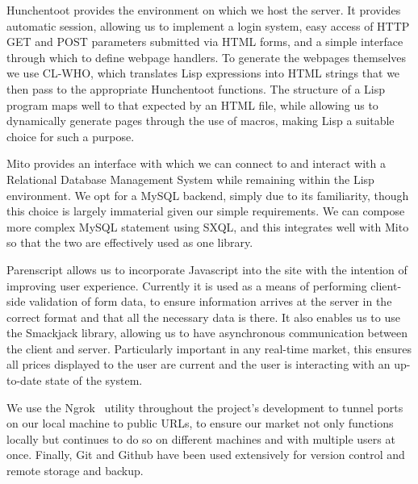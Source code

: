 Hunchentoot provides the environment on which we host the server. It provides
automatic session, allowing us to implement a login system, easy access of HTTP
GET and POST parameters submitted via HTML forms, and a simple interface
through which to define webpage handlers. To generate the webpages themselves
we use CL-WHO, which translates Lisp expressions into HTML strings that we then
pass to the appropriate Hunchentoot functions. The structure of a Lisp program
maps well to that expected by an HTML file, while allowing us to dynamically
generate pages through the use of macros, making Lisp a suitable choice for
such a purpose.

Mito provides an interface with which we can connect to and interact with a
Relational Database Management System while remaining within the Lisp
environment. We opt for a MySQL backend, simply due to its familiarity, though
this choice is largely immaterial given our simple requirements. We can compose
more complex MySQL statement using SXQL, and this integrates well with Mito so
that the two are effectively used as one library.

Parenscript allows us to incorporate Javascript into the site with the
intention of improving user experience. Currently it is used as a means of
performing client-side validation of form data, to ensure information arrives
at the server in the correct format and that all the necessary data is there.
It also enables us to use the Smackjack library, allowing us to have
asynchronous communication between the client and server. Particularly
important in any real-time market, this ensures all prices displayed to the
user are current and the user is interacting with an up-to-date state of the
system.

We use the Ngrok~\cite{ngrok} utility throughout the project's development to
tunnel ports on our local machine to public URLs, to ensure our market not only
functions locally but continues to do so on different machines and with
multiple users at once. Finally, Git and Github have been used extensively for
version control and remote storage and backup.
